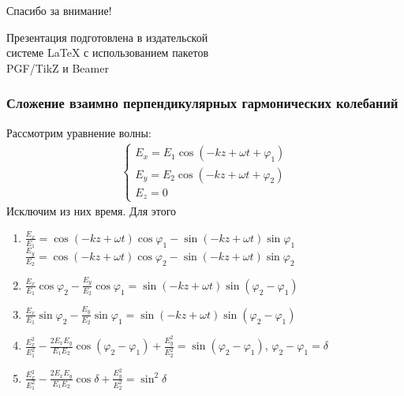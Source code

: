 \documentclass[10pt,pdf,hyperref={unicode}, dvipsnames]{beamer}
\begin{document}

\begin{frame}[plain]
	\vspace{4cm}
	\begin{center}
		\Huge
		Спасибо за внимание!
	\end{center}
	\vspace{2.5cm}
	\begin{center}
		\color{black!30!white}
		Презентация подготовлена в издательской \\
		системе LaTeX с использованием пакетов \\
		PGF/TikZ и Beamer
	\end{center}
\end{frame}


\begin{frame}
	\frametitle{Сложение взаимно перпендикулярных гармонических колебаний}
	Рассмотрим уравнение волны: 
	\begin{gather*} 
		\begin{cases} 
			E_x = E_1\cos\left(-kz+\omega t+\varphi_1\right) \\ 
			E_y = E_2\cos\left(-kz+\omega t+\varphi_2\right) \\ 
			E_z = 0 
		\end{cases}
	\end{gather*}
	Исключим из них время. Для этого 
	\begin{enumerate} 
		\item %
		      $\frac{E_x}{E_1}=\cos(-{k}{z}+\omega t)\cos\varphi_1-\sin(-kz+\omega t)\sin\varphi_1$\\ %
		      $\frac{E_y}{E_2}=\cos(-kz+\omega t)\cos\varphi_2-\sin(-kz+\omega t)\sin\varphi_2$ %
		\item 
		      $\frac{E_x}{E_1}\cos\varphi_2-\frac{E_y}{E_2}\cos\varphi_1=\sin(-kz+\omega t)\sin(\varphi_2-\varphi_1)$
		\item 
		      $\frac{E_x}{E_1}\sin\varphi_2-\frac{E_y}{E_2}\sin\varphi_1=\sin(-kz+\omega t)\sin(\varphi_2-\varphi_1)$
		\item 
		      $\frac{E_x^2}{E_1^2}-\frac{2E_xE_y}{E_1E_2}\cos(\varphi_2-\varphi_1)+\frac{E_y^2}{E_2^2}=\sin(\varphi_2-\varphi_1)$, 
		      $\varphi_2-\varphi_1=\delta$
		\item $\frac{E_x^2}{E_1^2}-\frac{2E_xE_y}{E_1E_2}\cos\delta+\frac{E_y^2}{E_2^2}=\sin^2\delta$
	\end{enumerate}
\end{frame}
\end{document}

